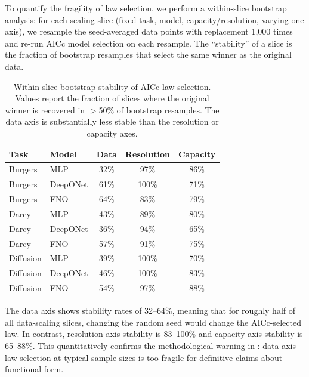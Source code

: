 \documentclass[11pt]{article}
\begin{document}
To quantify the fragility of law selection, we perform a within-slice
bootstrap analysis: for each scaling slice (fixed task, model,
capacity/resolution, varying one axis), we resample the seed-averaged
data points with replacement 1{,}000 times and re-run AICc model
selection on each resample.
The ``stability'' of a slice is the fraction of bootstrap resamples
that select the same winner as the original data.

\begin{table}[h]
\centering
\caption{Within-slice bootstrap stability of AICc law selection.
Values report the fraction of slices where the original winner is
recovered in $>$50\% of bootstrap resamples. The data axis is
substantially less stable than the resolution or capacity axes.}
\label{tab:bootstrap}
\begin{tabular}{@{}llccc@{}}
\toprule
\textbf{Task} & \textbf{Model} & \textbf{Data} &
\textbf{Resolution} & \textbf{Capacity} \\
\midrule
Burgers   & MLP      & 32\%  & 97\%  & 86\% \\
Burgers   & DeepONet & 61\%  & 100\% & 71\% \\
Burgers   & FNO      & 64\%  & 83\%  & 79\% \\
Darcy     & MLP      & 43\%  & 89\%  & 80\% \\
Darcy     & DeepONet & 36\%  & 94\%  & 65\% \\
Darcy     & FNO      & 57\%  & 91\%  & 75\% \\
Diffusion & MLP      & 39\%  & 100\% & 70\% \\
Diffusion & DeepONet & 46\%  & 100\% & 83\% \\
Diffusion & FNO      & 54\%  & 97\%  & 88\% \\
\bottomrule
\end{tabular}
\end{table}

\noindent
The data axis shows stability rates of 32--64\%, meaning that for
roughly half of all data-scaling slices, changing the random seed
would change the AICc-selected law.
In contrast, resolution-axis stability is 83--100\% and capacity-axis
stability is 65--88\%.
This quantitatively confirms the methodological warning in
: data-axis law selection at typical
sample sizes is too fragile for definitive claims about functional
form.
\end{document}
